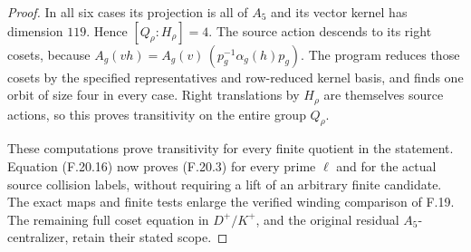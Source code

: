 \begin{proof}
In all six cases its projection is all of
$A_5$ and its vector kernel has dimension
$119$. Hence $[Q_\rho:H_\rho]=4$.
The source action descends to its right
cosets, because
$A_g(vh)=A_g(v)\,
 (p_g^{-1}\alpha_g(h)p_g)$.
The program reduces those cosets by the
specified representatives and row-reduced
kernel basis, and finds one orbit of size
four in every case.
Right translations by $H_\rho$ are themselves
source actions, so this proves transitivity
on the entire group $Q_\rho$.

These computations prove transitivity for
every finite quotient in the statement.
Equation (F.20.16) now proves (F.20.3) for
every prime $\ell$ and for the actual
source collision labels, without requiring
a lift of an arbitrary finite candidate.
The exact maps and finite tests enlarge the
verified winding comparison of F.19.
The remaining full coset equation in
$D^+/K^+$, and the original residual
$A_5$-centralizer, retain their stated scope.
\end{proof}
